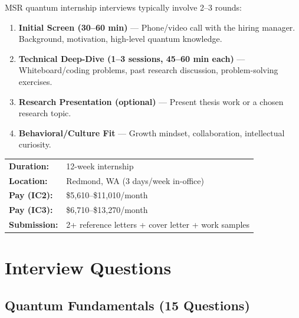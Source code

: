 \documentclass[11pt,a4paper]{article}
\begin{document}
MSR quantum internship interviews typically involve 2--3 rounds:

\begin{enumerate}[label=\textbf{Round \arabic*:}, leftmargin=2.5cm]
    \item \textbf{Initial Screen (30--60 min)} --- Phone/video call with the hiring manager. Background, motivation, high-level quantum knowledge.
    \item \textbf{Technical Deep-Dive (1--3 sessions, 45--60 min each)} --- Whiteboard/coding problems, past research discussion, problem-solving exercises.
    \item \textbf{Research Presentation (optional)} --- Present thesis work or a chosen research topic.
    \item \textbf{Behavioral/Culture Fit} --- Growth mindset, collaboration, intellectual curiosity.
\end{enumerate}

\begin{importantbox}
\begin{tabular}{@{}ll@{}}
\textbf{Duration:} & 12-week internship \\
\textbf{Location:} & Redmond, WA (3 days/week in-office) \\
\textbf{Pay (IC2):} & \$5,610--\$11,010/month \\
\textbf{Pay (IC3):} & \$6,710--\$13,270/month \\
\textbf{Submission:} & 2+ reference letters + cover letter + work samples \\
\end{tabular}
\end{importantbox}

\section{Interview Questions}
\label{sec:questions}

\subsection{Quantum Fundamentals (15 Questions)}
\end{document}
